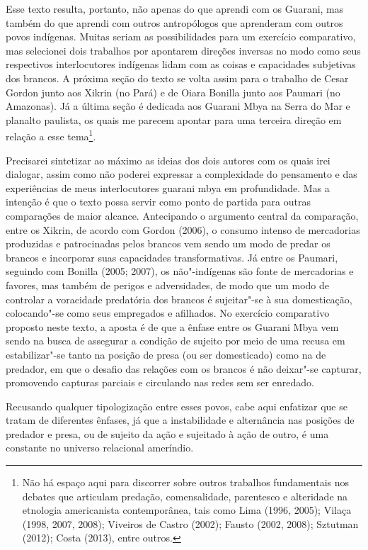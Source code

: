 Esse texto resulta, portanto, não apenas do que aprendi com os Guarani,
mas também do que aprendi com outros antropólogos que aprenderam com
outros povos indígenas. Muitas seriam as possibilidades para um
exercício comparativo, mas selecionei dois trabalhos por apontarem
direções inversas no modo como seus respectivos interlocutores
indígenas lidam com as coisas e capacidades subjetivas dos brancos. A
próxima seção do texto se volta assim para o trabalho de Cesar Gordon
junto aos Xikrin (no Pará) e de Oiara Bonilla junto aos Paumari (no
Amazonas). Já a última seção é dedicada aos Guarani Mbya na Serra do
Mar e planalto paulista, os quais me parecem apontar para uma terceira
direção em relação a esse tema\footnote{Não há espaço aqui para
discorrer sobre outros trabalhos fundamentais nos debates que articulam
predação, comensalidade, parentesco e alteridade na etnologia
americanista contemporânea, tais como Lima (1996, 2005); Vilaça (1998,
2007, 2008); Viveiros de Castro (2002); Fausto (2002, 2008); Sztutman
(2012); Costa (2013), entre outros.}. 

Precisarei sintetizar ao máximo as ideias dos dois autores com os quais
irei dialogar, assim como não poderei expressar a complexidade do
pensamento e das experiências de meus interlocutores guarani mbya em
profundidade. Mas a intenção é que o texto possa servir como ponto de
partida para outras comparações de maior alcance. Antecipando o
argumento central da comparação, entre os Xikrin, de acordo com Gordon
(2006), o consumo intenso de mercadorias produzidas e patrocinadas
pelos brancos vem sendo um modo de predar os brancos e incorporar suas
capacidades transformativas. Já entre os Paumari, seguindo com Bonilla
(2005; 2007), os não"-indígenas são fonte de mercadorias e favores, mas
também de perigos e adversidades, de modo que um modo de controlar a
voracidade predatória dos brancos é sujeitar"-se à sua domesticação,
colocando"-se como seus empregados e afilhados. No exercício comparativo
proposto neste texto, a aposta é de que a ênfase entre os Guarani Mbya
vem sendo na busca de assegurar a condição de sujeito por meio de uma
recusa em estabilizar"-se tanto na posição de presa (ou ser domesticado)
como na de predador, em que o desafio das relações com os brancos é não
deixar"-se capturar, promovendo capturas parciais e circulando nas redes
sem ser enredado. 

Recusando qualquer tipologização entre esses povos, cabe aqui enfatizar
que se tratam de diferentes ênfases, já que a instabilidade e
alternância nas posições de predador e presa, ou de sujeito da ação e
sujeitado à ação de outro, é uma constante no universo relacional
ameríndio. 

